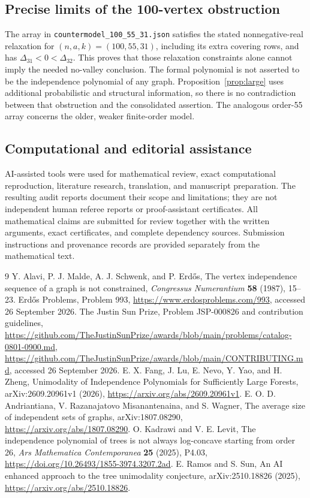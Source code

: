 \documentclass[11pt,a4paper]{article}
\theoremstyle{definition}\newtheorem{definition}[theorem]{Definition}
\theoremstyle{remark}\newtheorem{remark}[theorem]{Remark}
\begin{document}
\subsection{Precise limits of the 100-vertex obstruction}
The array in \texttt{countermodel\_100\_55\_31.json} satisfies the stated nonnegative-real relaxation for $(n,a,k)=(100,55,31)$, including its extra covering rows, and has $\Delta_{31}<0<\Delta_{32}$. This proves that those relaxation constraints alone cannot imply the needed no-valley conclusion. The formal polynomial is not asserted to be the independence polynomial of any graph. Proposition~\ref{prop:large} uses additional probabilistic and structural information, so there is no contradiction between that obstruction and the consolidated assertion. The analogous order-55 array concerns the older, weaker finite-order model.

\subsection{Computational and editorial assistance}
AI-assisted tools were used for mathematical review, exact computational reproduction, literature research, translation, and manuscript preparation. The resulting audit reports document their scope and limitations; they are not independent human referee reports or proof-assistant certificates. All mathematical claims are submitted for review together with the written arguments, exact certificates, and complete dependency sources. Submission instructions and provenance records are provided separately from the mathematical text.

\begin{thebibliography}{9}
 Y. Alavi, P. J. Malde, A. J. Schwenk, and P. Erd\H{o}s, The vertex independence sequence of a graph is not constrained, \emph{Congressus Numerantium} \textbf{58} (1987), 15--23.
 Erd\H{o}s Problems, Problem 993, \url{https://www.erdosproblems.com/993}, accessed 26 September 2026.
 The Justin Sun Prize, Problem JSP-000826 and contribution guidelines, \url{https://github.com/TheJustinSunPrize/awards/blob/main/problems/catalog-0801-0900.md}, \url{https://github.com/TheJustinSunPrize/awards/blob/main/CONTRIBUTING.md}, accessed 26 September 2026.
 E. X. Fang, J. Lu, E. Nevo, Y. Yao, and H. Zheng, Unimodality of Independence Polynomials for Sufficiently Large Forests, arXiv:2609.20961v1 (2026), \url{https://arxiv.org/abs/2609.20961v1}.
 E. O. D. Andriantiana, V. Razanajatovo Misanantenaina, and S. Wagner, The average size of independent sets of graphs, arXiv:1807.08290, \url{https://arxiv.org/abs/1807.08290}.
 O. Kadrawi and V. E. Levit, The independence polynomial of trees is not always log-concave starting from order 26, \emph{Ars Mathematica Contemporanea} \textbf{25} (2025), P4.03, \url{https://doi.org/10.26493/1855-3974.3207.2ad}.
 E. Ramos and S. Sun, An AI enhanced approach to the tree unimodality conjecture, arXiv:2510.18826 (2025), \url{https://arxiv.org/abs/2510.18826}.
\end{thebibliography}
\end{document}
